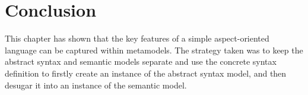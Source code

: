 \section{Conclusion}

This chapter has shown that the key features of a simple
aspect-oriented language can be captured within metamodels. The
strategy taken was to keep the abstract syntax and semantic models
separate and use the concrete syntax definition to firstly create
an instance of the abstract syntax model, and then desugar it into
an instance of the semantic model.
